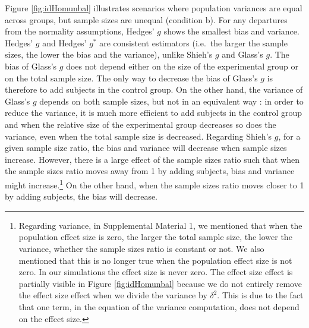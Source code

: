 \documentclass[
  english,
  man]{apa6}
\begin{document}
Figure \ref{fig:idHomunbal} illustrates scenarios where population variances are equal across groups, but sample sizes are unequal (condition b). For any departures from the normality assumptions, Hedges' \(g\) shows the smallest bias and variance. Hedges' \(g\) and Hedges' \(g^*\) are consistent estimators (i.e.~the larger the sample sizes, the lower the bias and the variance), unlike Shieh's \(g\) and Glass's \(g\). The bias of Glass's \(g\) does not depend either on the size of the experimental group or on the total sample size. The only way to decrease the bias of Glass's \(g\) is therefore to add subjects in the control group. On the other hand, the variance of Glass's \(g\) depends on both sample sizes, but not in an equivalent way : in order to reduce the variance, it is much more efficient to add subjects in the control group and when the relative size of the experimental group decreases so does the variance, even when the total sample size is decreased. Regarding Shieh's \(g\), for a given sample size ratio, the bias and variance will decrease when sample sizes increase. However, there is a large effect of the sample sizes ratio such that when the sample sizes ratio moves away from 1 by adding subjects, bias and variance might increase.\footnote{Regarding variance, in Supplemental Material 1, we mentioned that when the population effect size is zero, the larger the total sample size, the lower the variance, whether the sample sizes ratio is constant or not. We also mentioned that this is no longer true when the population effect size is not zero. In our simulations the effect size is never zero. The effect size effect is partially visible in Figure \ref{fig:idHomunbal} because we do not entirely remove the effect size effect when we divide the variance by $\delta^2$. This is due to the fact that one term, in the equation of the variance computation, does not depend on the effect size.} On the other hand, when the sample sizes ratio moves closer to 1 by adding subjects, the bias will decrease.
\end{document}
